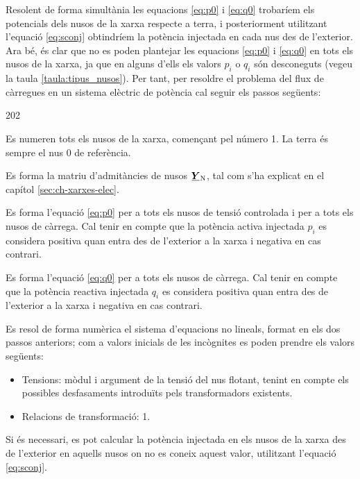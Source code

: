 Resolent de forma simultània les equacions \eqref{eq:p0} i
\eqref{eq:q0} trobaríem els potencials dels nusos de la xarxa
respecte a  terra, i posteriorment utilitzant l'equació
\eqref{eq:sconj} obtindríem la potència injectada en cada nus des
de l'exterior. Ara bé, és clar que no es poden plantejar les
equacions \eqref{eq:p0} i \eqref{eq:q0} en tots els nusos de la
xarxa, ja que en alguns d'ells els valors $p_i$ o $q_i$ són
desconeguts (vegeu la taula \vref{taula:tipus_nusos}). Per tant, per
 resoldre el problema del flux de càrregues en un sistema
elèctric de potència cal seguir els passos següents:
\begin{dingautolist}{202}
    \item Es numeren tots els nusos de la xarxa, començant pel número 1. La terra és sempre el nus 0 de referència.
   \item Es forma la matriu d'admitàncies de nusos $\mcmplx{Y}\ped{N}$, tal com s'ha
   explicat en el capítol \ref{sec:ch-xarxes-elec}.
   \item Es forma l'equació \eqref{eq:p0} per a tots els nusos de tensió controlada i per
   a tots els nusos de càrrega. Cal tenir en compte que la potència activa  injectada $p_i$ es considera
   positiva quan entra des de l'exterior a la xarxa i negativa en cas contrari.
   \item Es forma l'equació \eqref{eq:q0} per a tots els nusos de càrrega. Cal tenir en compte
   que la potència reactiva injectada $q_i$  es considera positiva quan entra des de l'exterior a la xarxa i negativa en cas contrari.
   \item Es resol de forma numèrica el sistema d'equacions no lineals, format en els dos
   passos anteriors; com a valors inicials de les incògnites es poden prendre els valors
   següents:
   \begin{itemize}
    \item Tensions: mòdul i argument de la tensió del nus flotant, tenint en compte els possibles desfasaments introduïts pels transformadors existents.
       \item Relacions de transformació: 1.
   \end{itemize}
   \item Si és necessari,  es pot calcular la potència injectada en els nusos de la xarxa
   des de l'exterior en aquells nusos on no es
   coneix aquest valor, utilitzant    l'equació \eqref{eq:sconj}.
\end{dingautolist}



